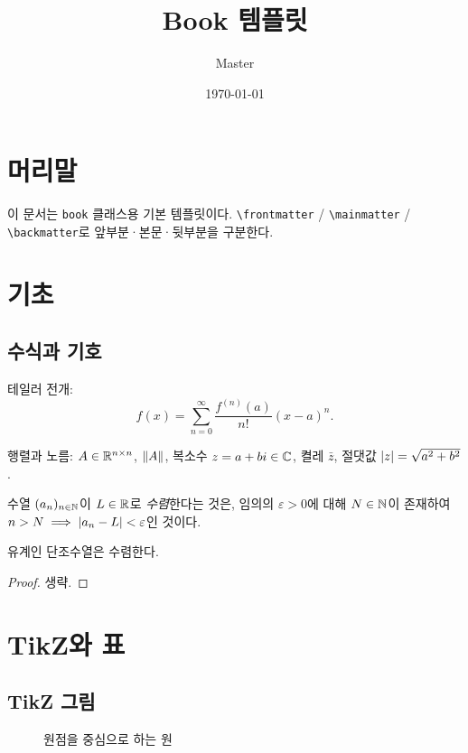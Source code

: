 \documentclass[a4paper,11pt]{book}
\title{Book 템플릿}
\author{Master}
\date{\today}
\begin{document}
\frontmatter
\maketitle
\tableofcontents

\chapter*{머리말}
이 문서는 \texttt{book} 클래스용 기본 템플릿이다.
\verb|\frontmatter| / \verb|\mainmatter| / \verb|\backmatter|로 앞부분·본문·뒷부분을 구분한다.

\mainmatter

\chapter{기초}
\label{ch:basics}

\section{수식과 기호}
테일러 전개:
\begin{equation}
  f(x) = \sum_{n=0}^{\infty} \frac{f^{(n)}(a)}{n!}(x-a)^n.
\end{equation}

행렬과 노름: $A \in \mathbb{R}^{n\times n}$, $\lVert A\rVert$, 복소수 $z = a+bi \in \mathbb{C}$,
켤레 $\bar z$, 절댓값 $\lvert z\rvert = \sqrt{a^2+b^2}$.

\begin{definition}[수열의 극한]
  수열 $(a_n)_{n\in\mathbb{N}}$이 $L \in \mathbb{R}$로 \emph{수렴}한다는 것은,
  임의의 $\varepsilon>0$에 대해 $N \in \mathbb{N}$이 존재하여 $n>N \implies \lvert a_n-L\rvert<\varepsilon$인 것이다.
\end{definition}

\begin{theorem}[단조수렴정리]
  유계인 단조수열은 수렴한다.
\end{theorem}
\begin{proof}
  생략.
\end{proof}

\chapter{TikZ와 표}

\section{TikZ 그림}
\begin{figure}[H]
  \centering
  \caption{원점을 중심으로 하는 원}
\end{figure}
\end{document}
